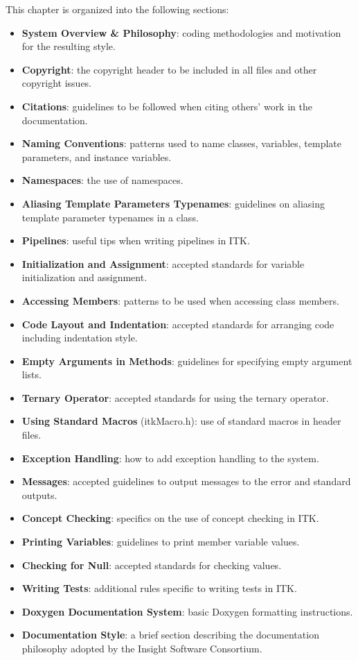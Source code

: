 This chapter is organized into the following sections:
\begin{itemize}
\item \textbf{System Overview \& Philosophy}: coding methodologies and
motivation for the resulting style.
\item \textbf{Copyright}: the copyright header to be included in all files and
other copyright issues.
\item \textbf{Citations}: guidelines to be followed when citing others' work in
the documentation.
\item \textbf{Naming Conventions}: patterns used to name classes, variables,
template parameters, and instance variables.
\item \textbf{Namespaces}: the use of namespaces.
\item \textbf{Aliasing Template Parameters Typenames}: guidelines on aliasing
template parameter typenames in a class.
\item \textbf{Pipelines}: useful tips when writing pipelines in ITK.
\item \textbf{Initialization and Assignment}: accepted standards for variable
initialization and assignment.
\item \textbf{Accessing Members}: patterns to be used when accessing class
members.
\item \textbf{Code Layout and Indentation}: accepted standards for arranging
code including indentation style.
\item \textbf{Empty Arguments in Methods}: guidelines for specifying empty
argument lists.
\item \textbf{Ternary Operator}: accepted standards for using the ternary
operator.
\item \textbf{Using Standard Macros} (itkMacro.h): use of standard macros in
header files.
\item \textbf{Exception Handling}: how to add exception handling to the system.
\item \textbf{Messages}: accepted guidelines to output messages to the error
and standard outputs.
\item \textbf{Concept Checking}: specifics on the use of concept checking in
ITK.
\item \textbf{Printing Variables}: guidelines to print member variable values.
\item \textbf{Checking for Null}: accepted standards for checking 
values.
\item \textbf{Writing Tests}: additional rules specific to writing tests in ITK.
\item \textbf{Doxygen Documentation System}: basic Doxygen formatting
instructions.
\item \textbf{Documentation Style}: a brief section describing the
documentation philosophy adopted by the Insight Software Consortium.
\end{itemize}

